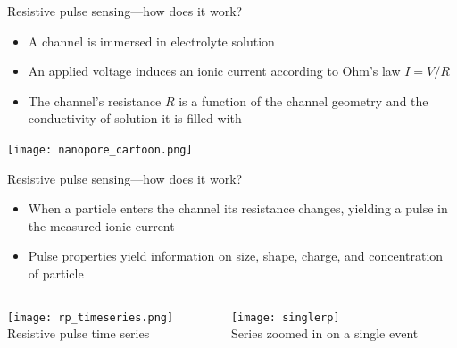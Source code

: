 \begin{frame}[c]{Resistive pulse sensing---how does it work?}

	\begin{itemize}
		\item A channel is immersed in electrolyte solution
		\item An applied voltage induces an ionic current according to Ohm's law $I=V/R$
		\item The channel's resistance $R$ is a function of the channel geometry and the conductivity of solution it is filled with
	\end{itemize}


	{\centering 
		\texttt{[image: nanopore\_cartoon.png]} \\
		\par
	}

	
\end{frame}



\begin{frame}[c]{Resistive pulse sensing---how does it work?}

	\begin{itemize}
		\item When a particle enters the channel its resistance changes, yielding a pulse in the measured ionic current
		\item Pulse properties yield information on size, shape, charge, and concentration of particle
	\end{itemize}
	
	\begin{columns}[t]
	
		\begin{column}[T]{2.25in}
			{\centering
				\texttt{[image: rp\_timeseries.png]} \\
				Resistive pulse time series \\
				\par
			}
		\end{column}
		
		\begin{column}[T]{2.25in}
			{\centering
				\texttt{[image: singlerp]} \\
				Series zoomed in on a single event \\
				\par
			}
		\end{column}

	\end{columns}


	
\end{frame}


